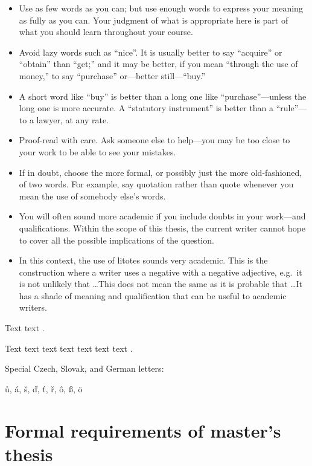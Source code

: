 \begin{itemize}
\item  Use as few words as you can; but use enough words to express your meaning as fully as you can. Your judgment of what is appropriate here is part of what you should learn throughout your course.
\item  Avoid lazy words such as ``nice''.
It is usually better to say ``acquire'' or ``obtain'' than ``get;'' and it may be better, if you mean ``through the use of money,'' to say ``purchase'' or---better still---``buy.''
\item A short word like ``buy'' is better than a long one like ``purchase''---unless the long one is more accurate.
A ``statutory instrument'' is better than a ``rule''---to a lawyer, at any rate.
\item Proof-read with care.
Ask someone else to help---you may be too close to your work to be able to see your mistakes.
\item If in doubt, choose the more formal, or possibly just the more old-fashioned, of two words.
For example, say quotation rather than quote whenever you mean the use of somebody else's words.
\end{itemize}



\begin{itemize}
\item You will often sound more academic if you include doubts in your work---and qualifications.
Within the scope of this thesis, the current writer cannot hope to cover all the possible implications of the question.
\item In this context, the use of litotes sounds very academic.
This is the construction where a writer uses a negative with a negative adjective, e.g.\ it is not unlikely that \ldots This does not mean the same as it is probable that \ldots It has a shade of meaning and qualification that can be useful to academic writers.
\end{itemize}


Text text  \citet{Haufler2006}.

Text text text text text text text \cite[see, ,][pg.~10]{Haaparanta1996}. 

Special Czech, Slovak, and German letters:

\r{u}, \'{a}, \v{s}, \v{d}, \v{t}, \v{r}, \^{o}, \ss{}, \"{o}



\section{Formal requirements of master's thesis}
\label{sec:formal}

